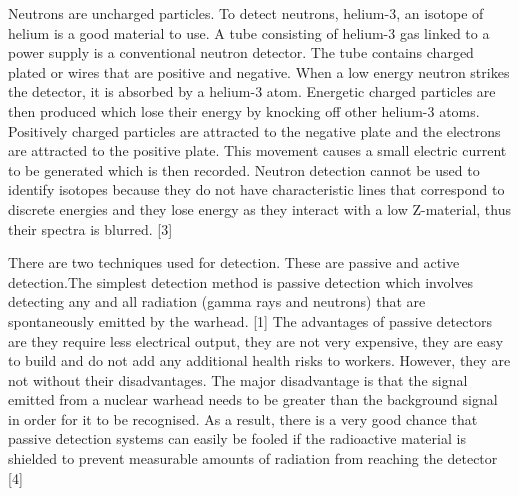 \documentclass[twoside,titlepage,11pt,twocolumn,a4paper]{article}
\begin{document}
Neutrons are uncharged particles. To detect neutrons, helium-3, an
isotope of helium is a good material to use. A tube consisting of
helium-3 gas linked to a power supply is a conventional neutron
detector. The tube contains charged plated or wires that are positive
and negative. When a low energy neutron strikes the detector, it is
absorbed by a helium-3 atom.  Energetic charged particles are then
produced which lose their energy by knocking off other helium-3
atoms. Positively charged particles are attracted to the negative
plate and the electrons are attracted to the positive plate. This
movement causes a small electric current to be generated which is then
recorded. Neutron detection cannot be used to identify isotopes
because they do not have characteristic lines that correspond to
discrete energies and they lose energy as they interact with a low
Z-material, thus their spectra is blurred. [3]

There are two techniques used for detection. These are passive and
active detection.The simplest detection method is passive detection
which involves detecting any and all radiation (gamma rays and
neutrons) that are spontaneously emitted by the warhead. [1] The
advantages of passive detectors are they require less electrical
output, they are not very expensive, they are easy to build and do not
add any additional health risks to workers. However, they are not
without their disadvantages. The major disadvantage is that the signal
emitted from a nuclear warhead needs to be greater than the background
signal in order for it to be recognised. As a result, there is a very
good chance that passive detection systems can easily be fooled if the
radioactive material is shielded to prevent measurable amounts of
radiation from reaching the detector [4]
\end{document}
